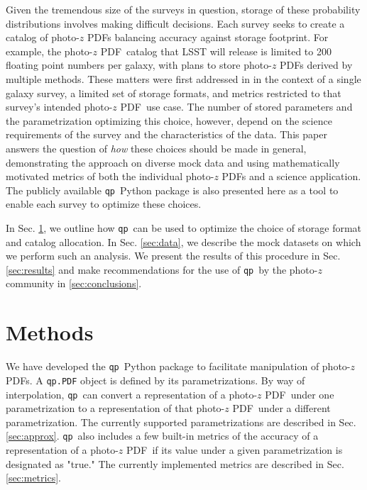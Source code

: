 \documentclass[\docopts]{\docclass}
\newcommand{\qp}{\texttt{qp}}
\newcommand{\pz}{photo-$z$ PDF}
\begin{document}
Given the tremendous size of the surveys in question, storage of these 
probability distributions involves making difficult decisions.  Each survey 
seeks to create a catalog of \pz s balancing accuracy against storage 
footprint.  For example, the \pz\ catalog that LSST will release is limited to 
200 floating point numbers per galaxy, with plans to store \pz s derived by 
multiple methods.  \citep{juric_data_2017}    These matters were first addressed in 
\citet{carrasco_kind_sparse_2014} in the context of a single galaxy survey, a 
limited set of storage formats, and metrics restricted to that survey's 
intended \pz\ use case.  The number of stored parameters and the 
parametrization optimizing this choice, however, depend on the science 
requirements of the survey and the characteristics of the data.  This paper 
answers the question of \textit{how} these choices should be made in general, 
demonstrating the approach on diverse mock data and using mathematically 
motivated metrics of both the individual \pz s and a science application.  The 
publicly available \qp\ Python package is also presented here as a tool to 
enable each survey to optimize these choices.

In Sec. \ref{sec:methods}, we outline how \qp\ can be used to optimize the 
choice of storage format and catalog allocation.  In Sec. \ref{sec:data}, we 
describe the mock datasets on which we perform such an analysis.  We present 
the results of this procedure in Sec. \ref{sec:results} and make 
recommendations for the use of \qp\ by the photo-$z$ community in 
\ref{sec:conclusions}.








\section{Methods}
\label{sec:methods}



We have developed the \qp\ Python package to facilitate manipulation of \pz s.  
A \texttt{qp.PDF} object is defined by its parametrizations.  By way of 
interpolation, \qp\ can convert a representation of a \pz\ under one 
parametrization to a representation of that \pz\ under a different 
parametrization.  The currently supported parametrizations are described in 
Sec. \ref{sec:approx}.  \qp\ also includes a few built-in metrics of the 
accuracy of a representation of a \pz\ if its value under a given 
parametrization is designated as "true."  The currently implemented metrics are 
described in Sec. \ref{sec:metrics}.
\end{document}
